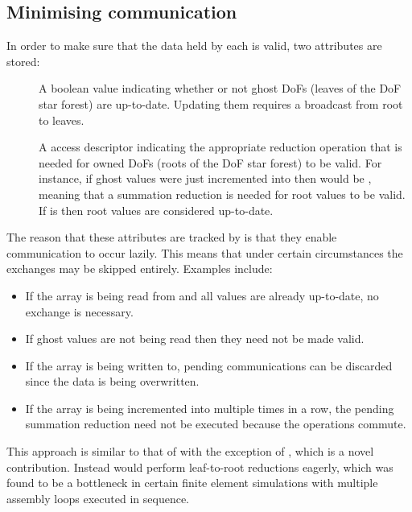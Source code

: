 \documentclass[thesis]{subfiles}
\begin{document}
\subsection{Minimising communication}

In order to make sure that the data held by each  is valid, two attributes are stored:
\begin{description}
  \item[]
    A boolean value indicating whether or not ghost DoFs (leaves of the DoF star forest) are up-to-date.
    Updating them requires a broadcast from root to leaves.

  \item[]
    A  access descriptor indicating the appropriate reduction operation that is needed for owned DoFs (roots of the DoF star forest) to be valid.
    For instance, if ghost values were just incremented into then  would be , meaning that a summation reduction is needed for root values to be valid.
    If  is  then root values are considered up-to-date.
\end{description}

The reason that these attributes are tracked by  is that they enable communication to occur lazily.
This means that under certain circumstances the exchanges may be skipped entirely.
Examples include:
\begin{itemize}
  \item If the array is being read from and all values are already up-to-date, no exchange is necessary.
  \item If ghost values are not being read then they need not be made valid.
  \item If the array is being written to, pending communications can be discarded since the data is being overwritten.
  \item If the array is being incremented into multiple times in a row, the pending summation reduction need not be executed because the operations commute.
\end{itemize}

This approach is similar to that of  with the exception of , which is a novel contribution.
Instead  would perform leaf-to-root reductions eagerly, which was found to be a bottleneck in certain finite element simulations with multiple assembly loops executed in sequence.
\end{document}
